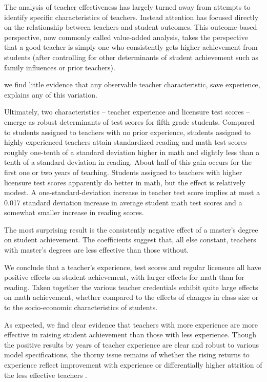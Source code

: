 The analysis of teacher effectiveness has largely turned away from attempts to identify
specific characteristics of teachers. Instead attention has focused directly on the relationship between teachers and student outcomes. This outcome-based perspective, now commonly called value-added analysis, takes the perspective that a good teacher is simply one
who consistently gets higher achievement from students (after controlling for other determinants of student achievement such as family influences or prior teachers). \citep{Hanushek_et_al_2012}


we find little evidence that any observable teacher characteristic, save experience, explains any of this variation. \citep{Clotfelter_et_al_2006}


Ultimately, two characteristics – teacher experience and licensure test scores – emerge as robust determinants of test scores for fifth grade students. Compared to students assigned to
teachers with no prior experience, students assigned to highly experienced teachers attain standardized reading and math test scores roughly one-tenth of a standard deviation higher in math and slightly less than a tenth of a standard deviation in reading. About half of this gain occurs for the first one or two years of teaching. Students assigned to teachers with higher licensure test scores apparently do better in math, but the effect is relatively modest. A one-standard-deviation increase in teacher test score implies at most a 0.017 standard deviation increase in average student math test scores and a somewhat smaller increase in reading scores. \citep{Clotfelter_et_al_2006}


The most surprising result is the consistently negative effect of a master’s degree on student achievement. The coefficients suggest that, all else constant, teachers with master’s degrees are less effective than those without. \citep{Clotfelter_et_al_2006}


We conclude that a teacher’s experience, test scores and regular licensure all have positive effects on student achievement, with larger effects for math than for reading. Taken together the various teacher credentials exhibit quite large effects on math achievement, whether compared to the effects of changes in class size or to the socio-economic characteristics of students. \citep{Clotfelter_et_al_2007}


As expected, we find clear evidence that teachers with more experience are more effective in raising student achievement than those with less experience. Though the positive results by years of teacher experience are clear and robust to various model specifications, the thorny issue remains of whether the rising returns to experience reflect improvement with experience or differentially higher attrition of the less effective teachers \citep{Rockoff_2004}. 


